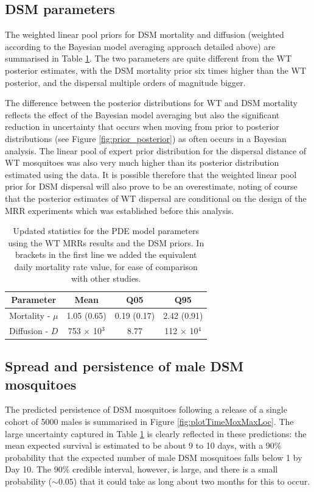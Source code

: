 \documentclass[]{bmcart}
\begin{document}
\subsection{DSM parameters}
The weighted linear pool priors for DSM mortality and diffusion (weighted according to the Bayesian model averaging approach detailed above) are summarised in Table \ref{tble:sumStatPPpostbma}. The two parameters are quite different from the WT posterior estimates, with the DSM mortality prior six times higher than the WT posterior, and the dispersal multiple orders of magnitude bigger. 

The difference between the posterior distributions for WT and DSM mortality reflects the effect of the Bayesian model averaging but also the significant reduction in uncertainty that occurs when moving from prior to posterior distributions (see Figure \ref{fig:prior_posterior}) as often occurs in a Bayesian analysis. The linear pool of expert prior distribution for the dispersal distance of WT mosquitoes was also very much higher than its posterior distribution estimated using the data. It is possible therefore that the weighted linear pool prior for DSM dispersal will also prove to be an overestimate, noting of course that the posterior estimates of WT dispersal are conditional on the design of the MRR experiments which was established before this analysis.

\begin{table}[h]
\centering
\begingroup\small
\begin{tabular}{|c|ccc|}
\hline
Parameter & Mean & Q05 & Q95  \\\hline
Mortality - $\mu$ & 1.05 (0.65) & 0.19 (0.17) & 2.42 (0.91)\\
Diffusion - $D$ & 753 $\times$ 10$^{3}$ & 8.77 & 112  $\times$ 10$^{4}$\\
\hline
\end{tabular}
\endgroup
\caption{\label{tble:sumStatPPpostbma} Updated statistics for the PDE model parameters using the WT MRRs results and the DSM priors. In brackets in the first line we added the equivalent daily mortality rate value, for ease of comparison with other studies.}
\end{table}

\subsection{Spread and persistence of male DSM mosquitoes}
The predicted persistence of DSM mosquitoes following a release of a single cohort of 5000 males is summarised in Figure \ref{fig:plotTimeMoxMaxLoc}. The large uncertainty captured in Table \ref{tble:sumStatPPpostbma} is clearly reflected in these predictions: the mean expected survival is estimated to be about 9 to 10 days, with a 90\% probability that the expected number of male DSM mosquitoes falls below 1 by Day 10. The 90\% credible interval, however, is large, and there is a small probability ($\sim 0.05$) that it could take as long about two months for this to occur.
\end{document}
